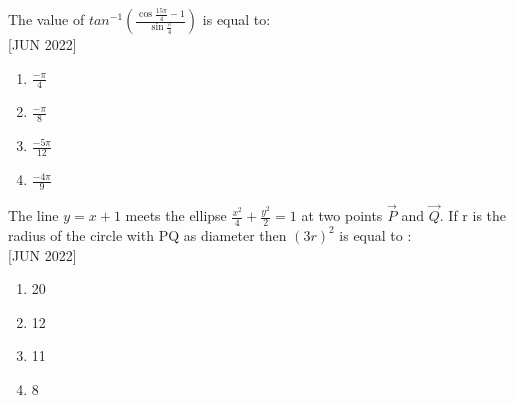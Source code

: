     \bigskip
    \item The value of $tan^{-1}{\left(\frac{\cos{\frac{15\pi}{4}} - 1}{\sin{\frac{\pi}{4}}}\right)}$ is equal to: \\\hfill{[JUN 2022]}
    \begin{multicols}{4}
    \begin{enumerate}
        \item $\frac{-\pi}{4}$
        \item $\frac{-\pi}{8}$
        \item $\frac{-5\pi}{12}$
        \item $\frac{-4\pi}{9}$
    \end{enumerate} 
    \end{multicols}
    \bigskip
    \item  The line $y = x + 1$ meets the ellipse $\frac{x^2}{4} + \frac{y^2}{2} = 1$ at two points $\vec{P}$ and $\vec{Q}$. If r is the radius of the circle with PQ as diameter then $(3r)^2$ is equal to : \\\hfill{[JUN 2022]}
    \begin{multicols}{4}
    \begin{enumerate}
        \item 20
        \item 12
        \item 11
        \item 8
    \end{enumerate} 
    \end{multicols}
